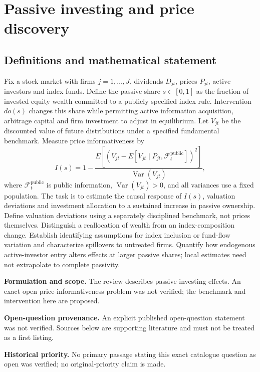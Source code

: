 \documentclass[11pt]{article}
\begin{document}
\section*{Passive investing and price discovery}\label{30007597}
\subsection{Definitions and mathematical statement}
Fix a stock market with firms \(j=1,\ldots,J\), dividends \(D_{jt}\), prices \(P_{jt}\), active investors and index funds. Define the passive share \(s\in[0,1]\) as the fraction of invested equity wealth committed to a publicly specified index rule. Intervention \(do(s)\) changes this share while permitting active information acquisition, arbitrage capital and firm investment to adjust in equilibrium. Let \(V_{jt}\) be the discounted value of future distributions under a specified fundamental benchmark. Measure price informativeness by
\[I(s)=1-\frac{E[(V_{jt}-E[V_{jt}\mid P_{jt},\mathcal F_t^{\mathrm{public}}])^2]}{\operatorname{Var}(V_{jt})},\]
where \(\mathcal F_t^{\mathrm{public}}\) is public information, \(\operatorname{Var}(V_{jt})>0\), and all variances use a fixed population. The task is to estimate the causal response of \(I(s)\), valuation deviations and investment allocation to a sustained increase in passive ownership. Define valuation deviations using a separately disciplined benchmark, not prices themselves. Distinguish a reallocation of wealth from an index-composition change. Establish identifying assumptions for index inclusion or fund-flow variation and characterize spillovers to untreated firms. Quantify how endogenous active-investor entry alters effects at larger passive shares; local estimates need not extrapolate to complete passivity.

\par\textbf{Formulation and scope.} The review describes passive-investing effects. An exact open price-informativeness problem was not verified; the benchmark and intervention here are proposed.

\par\textbf{Open-question provenance.} An explicit published open-question statement was not verified. Sources below are supporting literature and must not be treated as a first listing.

\par\textbf{Historical priority.} No primary passage stating this exact catalogue question as open was verified; no original-priority claim is made.
\end{document}

